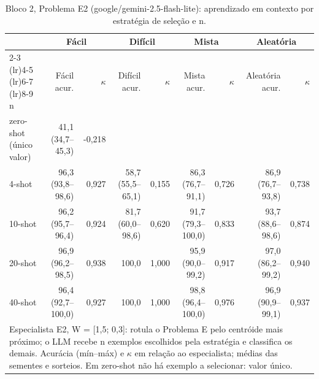 \begin{table}[htbp]
\centering
\small
\caption{Bloco 2, Problema E2 (google/gemini-2.5-flash-lite): aprendizado em contexto por estratégia de seleção e n.}
\label{tab:bloco2_E2_faseE_estrategia_x_nshot_flashlite}
\begin{tabular}{lrrrrrrrr}
\toprule
 & \multicolumn{2}{c}{Fácil} & \multicolumn{2}{c}{Difícil} & \multicolumn{2}{c}{Mista} & \multicolumn{2}{c}{Aleatória} \\ \cmidrule(lr){2-3} \cmidrule(lr){4-5} \cmidrule(lr){6-7} \cmidrule(lr){8-9}
n & Fácil acur. & $\kappa$ & Difícil acur. & $\kappa$ & Mista acur. & $\kappa$ & Aleatória acur. & $\kappa$ \\
\midrule
zero-shot (único valor) & 41,1 (34,7–45,3) & -0,218 &  &  &  &  &  &  \\
4-shot & 96,3 (93,8–98,6) & 0,927 & 58,7 (55,5–65,1) & 0,155 & 86,3 (76,7–91,1) & 0,726 & 86,9 (76,7–93,8) & 0,738 \\
10-shot & 96,2 (95,7–96,4) & 0,924 & 81,7 (60,0–98,6) & 0,620 & 91,7 (79,3–100,0) & 0,833 & 93,7 (88,6–98,6) & 0,874 \\
20-shot & 96,9 (96,2–98,5) & 0,938 & 100,0 & 1,000 & 95,9 (90,0–99,2) & 0,917 & 97,0 (86,2–99,2) & 0,940 \\
40-shot & 96,4 (92,7–100,0) & 0,927 & 100,0 & 1,000 & 98,8 (96,4–100,0) & 0,976 & 96,9 (90,9–99,1) & 0,937 \\
\bottomrule
\multicolumn{9}{p{0.95\linewidth}}{\footnotesize Especialista E2, W = [1,5; 0,3]: rotula o Problema E pelo centróide mais próximo; o LLM recebe n exemplos escolhidos pela estratégia e classifica os demais. Acurácia (mín–máx) e $\kappa$ em relação ao especialista; médias das sementes e sorteios. Em zero-shot não há exemplo a selecionar: valor único.} \\
\end{tabular}
\end{table}
